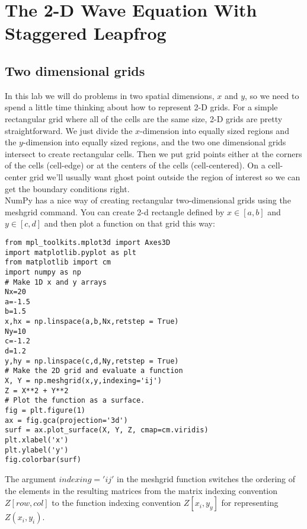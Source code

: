
\chapter*{The 2-D Wave Equation With \\ Staggered Leapfrog}
\section*{Two dimensional grids}

In this lab we will do problems in two spatial dimensions, $x$ and $y$, so we need
to spend a little time thinking about how to represent 2-D grids. For a simple
rectangular grid where all of the cells are the same size, 2-D grids are pretty
straightforward. We just divide the $x$-dimension into equally sized regions and
the $y$-dimension into equally sized regions, and the two one dimensional grids
intersect to create rectangular cells. Then we put grid points either at the corners
of the cells (cell-edge) or at the centers of the cells (cell-centered). On a cell-center
grid we\rq ll usually want ghost point outside the region of interest so we can get the
boundary conditions right. \\ NumPy has a nice way of creating rectangular two-dimensional grids using
the meshgrid command. You can create 2-d rectangle defined by $x \in [a,b]$ and
$y \in [c,d]$ and then plot a function on that grid this way:

\begin{lstlisting}
from mpl_toolkits.mplot3d import Axes3D
import matplotlib.pyplot as plt
from matplotlib import cm
import numpy as np
# Make 1D x and y arrays
Nx=20
a=-1.5
b=1.5
x,hx = np.linspace(a,b,Nx,retstep = True)
Ny=10
c=-1.2
d=1.2
y,hy = np.linspace(c,d,Ny,retstep = True)
# Make the 2D grid and evaluate a function
X, Y = np.meshgrid(x,y,indexing='ij')
Z = X**2 + Y**2
# Plot the function as a surface.
fig = plt.figure(1)
ax = fig.gca(projection='3d')
surf = ax.plot_surface(X, Y, Z, cmap=cm.viridis)
plt.xlabel('x')
plt.ylabel('y')
fig.colorbar(surf)
\end{lstlisting}

The argument $indexing='ij'$ in the meshgrid function switches the ordering
of the elements in the resulting matrices from the matrix indexing convention
$Z[row,col]$ to the function indexing convention $Z[x_i,y_y]$ for representing $Z(x_i, y_i)$.

